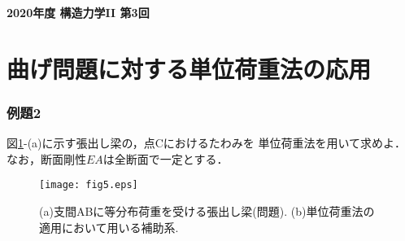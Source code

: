 \documentclass[10pt,a4j]{jarticle}
\newlength{\minitwocolumn}
\begin{document}
\newcommand{\fat}[1]{\mbox{\boldmath $#1$}}
\newcommand{\D}{\partial}
\newcommand{\w}{\omega}
\newcommand{\ga}{\alpha}
\newcommand{\gb}{\beta}
\newcommand{\gx}{\xi}
\newcommand{\gz}{\zeta}
\newcommand{\vhat}[1]{\hat{\fat{#1}}}
\newcommand{\spc}{\vspace{0.7\baselineskip}}
\newcommand{\halfspc}{\vspace{0.3\baselineskip}}

\newcommand{\twofig}[2]
 {
   \begin{figure}
     \begin{minipage}[t]{\minitwocolumn}
         \begin{center}   #1
         \end{center}
     \end{minipage}
         \hspace{\columnsep}
     \begin{minipage}[t]{\minitwocolumn}
         \begin{center} #2
         \end{center}
     \end{minipage}
   \end{figure}
 }
\begin{center}
	{\Large \bf 2020年度 構造力学II 第3回} \\
\end{center}
\section{曲げ問題に対する単位荷重法の応用}
\subsubsection{例題2}
図\ref{fig:fig2_5}-(a)に示す張出し梁の，点Cにおけるたわみを
単位荷重法を用いて求めよ．なお，断面剛性$EA$は全断面で一定とする．
\begin{figure}[h]
	\begin{center}
	\texttt{[image: fig5.eps]} 
	\end{center}
	\caption{(a)支間ABに等分布荷重を受ける張出し梁(問題).
	 (b)単位荷重法の適用において用いる補助系.} 
	\label{fig:fig2_5}
\end{figure}
\end{document}
